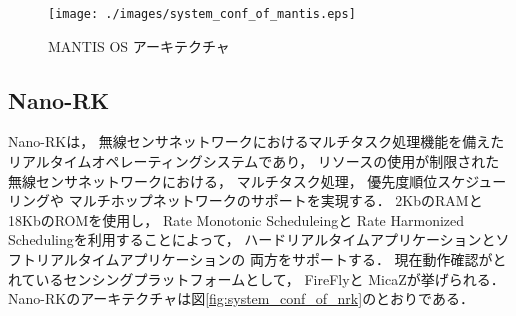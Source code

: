 
\begin{figure}[htbp]
 \begin{center}
  \texttt{[image: ./images/system\_conf\_of\_mantis.eps]}
 \end{center}
 \caption{MANTIS OS アーキテクチャ}
 \label{fig:system_conf_of_mantis}
\end{figure}




\subsection{Nano-RK}
Nano-RK\cite{Eswaran:2005:NER:1106608.1106672}は，
無線センサネットワークにおけるマルチタスク処理機能を備えた
リアルタイムオペレーティングシステムであり，
リソースの使用が制限された無線センサネットワークにおける，
マルチタスク処理，
優先度順位スケジューリングや
マルチホップネットワークのサポートを実現する．
2KbのRAMと18KbのROMを使用し，
Rate Monotonic Scheduleing\cite{Liu:1973:SAM:321738.321743}と
Rate Harmonized Scheduling\cite{Rowe:2008:RSS:1475690.1475895}を利用することによって，
ハードリアルタイムアプリケーションとソフトリアルタイムアプリケーションの
両方をサポートする．
現在動作確認がとれているセンシングプラットフォームとして，
FireFly\cite{Rowe_firefly:a}と
MicaZ\cite{Hill:2002:MWP:623308.624560}が挙げられる．
Nano-RKのアーキテクチャは図\ref{fig:system_conf_of_nrk}のとおりである．

